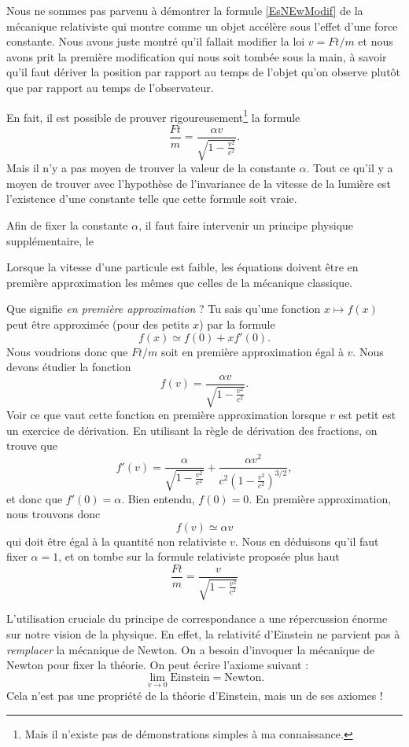 Nous ne sommes pas parvenu à démontrer la formule \eqref{EsNEwModif} de la mécanique relativiste qui montre comme un objet accélère sous l'effet d'une force constante. Nous avons juste montré qu'il fallait modifier la loi \( v=Ft/m\) et nous avons prit la première modification qui nous soit tombée sous la main, à savoir qu'il faut dériver la position par rapport au temps de l'objet qu'on observe plutôt que par rapport au temps de l'observateur.

En fait, il est possible de prouver rigoureusement\footnote{Mais il n'existe pas de démonstrations simples à ma connaissance.} la formule
\[
	\frac{ Ft }{ m }=\frac{ \alpha v }{ \sqrt{1-\frac{ v^2 }{ c^2 }} }.
\]
Mais il n'y a pas moyen de trouver la valeur de la constante \( \alpha\). Tout ce qu'il y a moyen de trouver avec l'hypothèse de l'invariance de la vitesse de la lumière est l'existence d'une constante telle que cette formule soit vraie.

Afin de fixer la constante \( \alpha\), il faut faire intervenir un principe physique supplémentaire, le 
\begin{loiphyz}
	Lorsque la vitesse d'une particule est faible, les équations doivent être en première approximation les mêmes que celles de la mécanique classique.
\end{loiphyz}
Que signifie \emph{en première approximation} ? Tu sais qu'une fonction \( x\mapsto f(x)\) peut être approximée (pour des petits \( x\)) par la formule
\[
	f(x)\simeq f(0)+xf'(0).
\]
Nous voudrions donc que \( Ft/m\) soit en première approximation égal à \( v\). Nous devons étudier la fonction
\[
	f(v)=\frac{ \alpha v }{ \sqrt{1-\frac{ v^2 }{ c^2 }} }.
\]
Voir ce que vaut cette fonction en première approximation lorsque \( v\) est petit est un exercice de dérivation. En utilisant la règle de dérivation des fractions, on trouve que
\[
	f'(v)=\frac{ \alpha }{ \sqrt{1-\frac{ v^2 }{ c^2 }} }+\frac{ \alpha v^2 }{ c^2\left( 1-\frac{ v^2 }{ c^2 } \right)^{3/2} },
\]
et donc que \( f'(0)=\alpha\). Bien entendu, \( f(0)=0\). En première approximation, nous trouvons donc
\begin{equation}
	f(v)\simeq \alpha v
\end{equation}
qui doit être égal à la quantité non relativiste \( v\). Nous en déduisons qu'il faut fixer \( \alpha=1\), et on tombe sur la formule relativiste proposée plus haut
\[
	\frac{ Ft }{ m }=\frac{ v }{ \sqrt{1-\frac{ v^2 }{ c^2 }} }
\]

L'utilisation cruciale du principe de correspondance a une répercussion énorme sur notre vision de la physique. En effet, la relativité d'Einstein ne parvient pas à \emph{remplacer} la mécanique de Newton. On a besoin d'invoquer la mécanique de Newton pour fixer la théorie. On peut écrire l'axiome suivant :
\begin{equation}
	\lim_{v\to 0}\text{Einstein}=\text{Newton}.
\end{equation}
Cela n'est pas une propriété de la théorie d'Einstein, mais un de ses axiomes !

